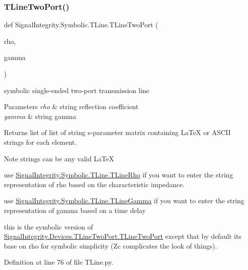 \mbox{\label{namespaceSignalIntegrity_1_1Symbolic_1_1TLine_a03366e71575a7dda96f6cba322d2ffce}} 
\subsubsection{\texorpdfstring{T\+Line\+Two\+Port()}{TLineTwoPort()}}
{\footnotesize\ttfamily def Signal\+Integrity.\+Symbolic.\+T\+Line.\+T\+Line\+Two\+Port (\begin{DoxyParamCaption}\item[{}]{rho,  }\item[{}]{gamma }\end{DoxyParamCaption})}



symbolic single-\/ended two-\/port transmission line 


\begin{DoxyParams}{Parameters}
{\em rho} & string reflection coefficient \\
\hline
{\em gamma} & string gamma \\
\hline
\end{DoxyParams}
\begin{DoxyReturn}{Returns}
list of list of string s-\/parameter matrix containing La\+TeX or A\+S\+C\+II strings for each element. 
\end{DoxyReturn}
\begin{DoxyNote}{Note}
strings can be any valid La\+TeX 

use \hyperlink{namespaceSignalIntegrity_1_1Symbolic_1_1TLine_a6e67758dfbb8c37100cd86a52783b20c}{Signal\+Integrity.\+Symbolic.\+T\+Line.\+T\+Line\+Rho} if you want to enter the string representation of rho based on the characteristic impedance. 

use \hyperlink{namespaceSignalIntegrity_1_1Symbolic_1_1TLine_a1789044d24922e3256a701fa4cca3717}{Signal\+Integrity.\+Symbolic.\+T\+Line.\+T\+Line\+Gamma} if you want to enter the string representation of gamma based on a time delay 

this is the symbolic version of \hyperlink{namespaceSignalIntegrity_1_1Devices_1_1TLineTwoPort_a7bd18f7b4b86ece0e8648407add746d4}{Signal\+Integrity.\+Devices.\+T\+Line\+Two\+Port.\+T\+Line\+Two\+Port} except that by default it\textquotesingle{}s base on rho for symbolic simplicity (Zc complicates the look of things). 
\end{DoxyNote}


Definition at line 76 of file T\+Line.\+py.

